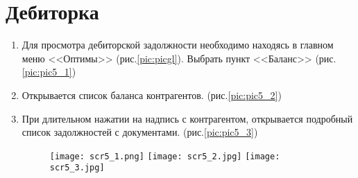 \section{Дебиторка}
\begin{enumerate}[\thesection .1]
	\item Для просмотра дебиторской задолжности необходимо находясь в главном меню <<Оптимы>> (рис.\ref{pic:picgl}). Выбрать пункт <<Баланс>>
	(рис.\ref{pic:pic5_1})
	\item Открывается список баланса контрагентов. %
	 (рис.\ref{pic:pic5_2})
	\item При длительном нажатии на надпись с контрагентом, открывается подробный список задолжностей с документами.	
	(рис.\ref{pic:pic5_3})	 
	 \begin{figure}[!h]
	 	\begin{floatrow}[3]
	 		{\texttt{[image: scr5\_1.png]}}
	 		{\texttt{[image: scr5\_2.jpg]}}         
	 		{\texttt{[image: scr5\_3.jpg]}}    
	 	\end{floatrow}
	 \end{figure}
	 
		
		
		

\end{enumerate}